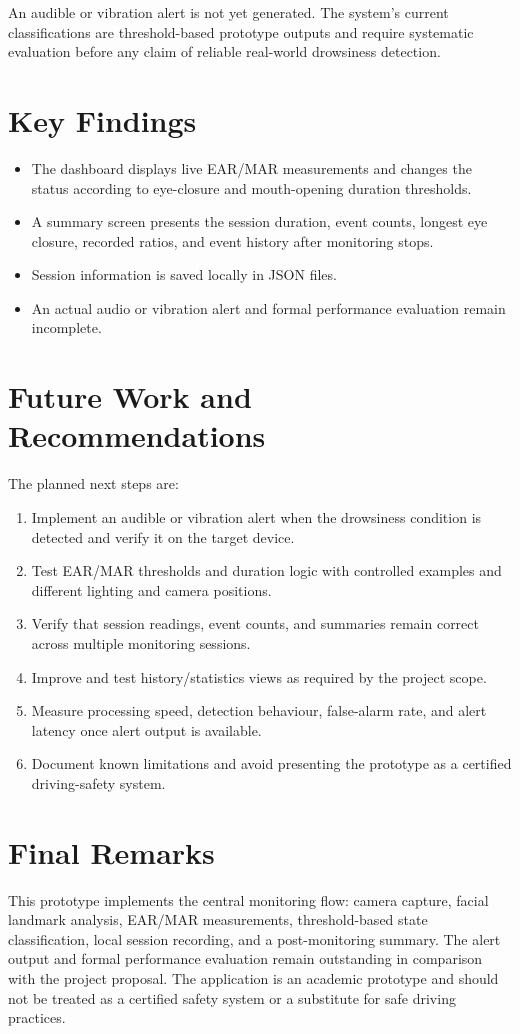 \documentclass{tietreport}
\begin{document}
An audible or vibration alert is not yet generated. The system's current classifications are threshold-based prototype outputs and require systematic evaluation before any claim of reliable real-world drowsiness detection.

\section{Key Findings}
\begin{itemize}
  \item The dashboard displays live EAR/MAR measurements and changes the status according to eye-closure and mouth-opening duration thresholds.
  \item A summary screen presents the session duration, event counts, longest eye closure, recorded ratios, and event history after monitoring stops.
  \item Session information is saved locally in JSON files.
  \item An actual audio or vibration alert and formal performance evaluation remain incomplete.
\end{itemize}

\section{Future Work and Recommendations}
The planned next steps are:
\begin{enumerate}
  \item Implement an audible or vibration alert when the drowsiness condition is detected and verify it on the target device.
  \item Test EAR/MAR thresholds and duration logic with controlled examples and different lighting and camera positions.
  \item Verify that session readings, event counts, and summaries remain correct across multiple monitoring sessions.
  \item Improve and test history/statistics views as required by the project scope.
  \item Measure processing speed, detection behaviour, false-alarm rate, and alert latency once alert output is available.
  \item Document known limitations and avoid presenting the prototype as a certified driving-safety system.
\end{enumerate}

\section{Final Remarks}
This prototype implements the central monitoring flow: camera capture, facial landmark analysis, EAR/MAR measurements, threshold-based state classification, local session recording, and a post-monitoring summary. The alert output and formal performance evaluation remain outstanding in comparison with the project proposal. The application is an academic prototype and should not be treated as a certified safety system or a substitute for safe driving practices.

\printbibliography[heading=bibintoc]
\end{document}
